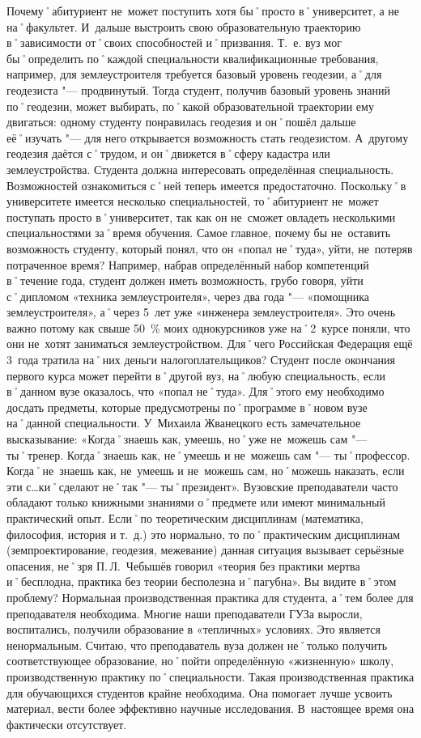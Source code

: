 \begin{drama}
	\maxspeaks Почему˚абитуриент не~может поступить хотя бы˚просто в˚университет, а не на˚факультет. И~дальше выстроить свою образовательную траекторию в˚зависимости от˚своих способностей и˚призвания. Т.~е. вуз мог бы˚определить по˚каждой специальности квалификационные требования, например, для землеустроителя требуется базовый уровень геодезии, а˚для геодезиста "--- продвинутый. Тогда студент, получив базовый уровень знаний по˚геодезии, может выбирать, по˚какой образовательной траектории ему двигаться: одному студенту понравилась геодезия и он˚пошёл дальше её˚изучать "--- для него открывается возможность стать геодезистом. А~другому геодезия даётся с˚трудом, и он˚движется в˚сферу кадастра или землеустройства. 
	\michaelspeaks Студента должна интересовать определённая специальность. Возможностей ознакомиться с˚ней теперь имеется предостаточно. Поскольку˚в университете имеется несколько специальностей, то˚абитуриент не~может поступать просто в˚университет, так как он не~сможет овладеть несколькими специальностями за˚время обучения.
	\maxspeaks Самое главное, почему бы не~оставить возможность студенту, который понял, что он  «попал не˚туда», уйти, не~потеряв потраченное время? Например, набрав определённый набор компетенций в˚течение года, студент должен иметь возможность, грубо говоря, уйти с˚дипломом  «техника землеустроителя», через два года "---  «помощника землеустроителя», а˚через 5~лет уже  «инженера землеустроителя». Это очень важно потому как свыше 50~\% моих однокурсников уже на˚2~курсе поняли, что они не~хотят заниматься землеустройством. Для˚чего Российская Федерация ещё 3~года тратила на˚них деньги налогоплательщиков?
	\michaelspeaks Студент после окончания первого курса может перейти в˚другой вуз, на˚любую специальность, если в˚данном вузе оказалось, что «попал не˚туда». Для˚этого ему необходимо досдать предметы, которые предусмотрены по˚программе в˚новом вузе на˚данной специальности.
	\maxspeaks У~Михаила Жванецкого есть замечательное высказывание:  «Когда˚знаешь как, умеешь, но˚уже не~можешь сам "--- ты˚тренер. Когда˚знаешь как, не˚умеешь и не~можешь сам "--- ты˚профессор. Когда˚не~знаешь как, не~умеешь и не~можешь сам, но˚можешь наказать, если эти с…ки˚сделают не˚так "--- ты˚президент». Вузовские преподаватели часто обладают только книжными знаниями о˚предмете или имеют минимальный практический опыт. Если˚по теоретическим дисциплинам (математика, философия, история и т.~д.) это нормально, то по˚практическим дисциплинам (земпроектирование, геодезия, межевание) данная ситуация вызывает серьёзные опасения, не˚зря П.\,Л.~Чебышёв говорил  «теория без практики мертва и˚бесплодна, практика без теории бесполезна и˚пагубна». Вы видите в˚этом проблему?
	\michaelspeaks Нормальная производственная практика для студента, а˚тем более для преподавателя необходима. Многие наши преподаватели ГУЗа выросли, воспитались, получили образование в «тепличных» условиях. Это является ненормальным. Считаю, что преподаватель вуза должен не˚только получить соответствующее образование, но˚пойти определённую «жизненную» школу, производственную практику по˚специальности. Такая производственная практика для обучающихся студентов крайне необходима. Она помогает лучше усвоить материал, вести более эффективно научные исследования. В~настоящее время она фактически отсутствует.
	

\end{drama}
